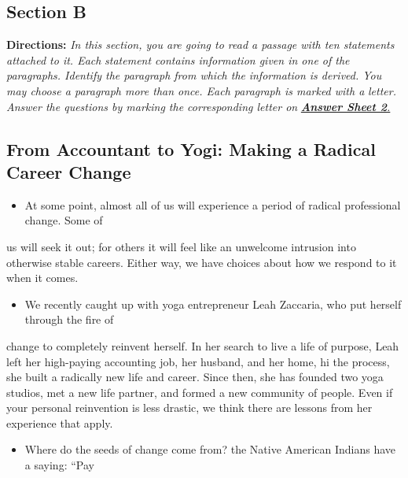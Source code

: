 \documentclass[UTF8,11pt]{ctexart}
\begin{document}
\subsection*{\textbf{Section B}}


\textbf{Directions:}\textit{ In this section, you are going to read a passage with ten statements attached to it. Each} \textit{statement contains information given in one of the paragraphs. Identify the paragraph from which the} \textit{information is derived. You may choose a paragraph more than once. Each paragraph is marked with a} \textit{letter. Answer the questions by marking the corresponding letter on}\textbf{\textit{ }}\textbf{\textit{\uline{Answer Sheet 2}}}\textit{\uline{.}}


\subsection*{\textbf{From Accountant to Yogi: Making a Radical Career Change}}


\begin{itemize}[leftmargin=2em,itemsep=.2em,topsep=.4em]\item[A.] At some point, almost all of us will experience a period of radical professional change. Some of
\end{itemize}

us will seek it out; for others it will feel like an unwelcome intrusion into otherwise stable careers. Either way, we have choices about how we respond to it when it comes.


\begin{itemize}[leftmargin=2em,itemsep=.2em,topsep=.4em]\item[B.] We recently caught up with yoga entrepreneur Leah Zaccaria, who put herself through the fire of
\end{itemize}

change to completely reinvent herself. In her search to live a life of purpose, Leah left her high-paying accounting job, her husband, and her home, hi the process, she built a radically new life and career. Since then, she has founded two yoga studios, met a new life partner, and formed a new community of people. Even if your personal reinvention is less drastic, we think there are lessons from her experience that apply.


\begin{itemize}[leftmargin=2em,itemsep=.2em,topsep=.4em]\item[C.] Where do the seeds of change come from? the Native American Indians have a saying: “Pay
\end{itemize}
\end{document}
